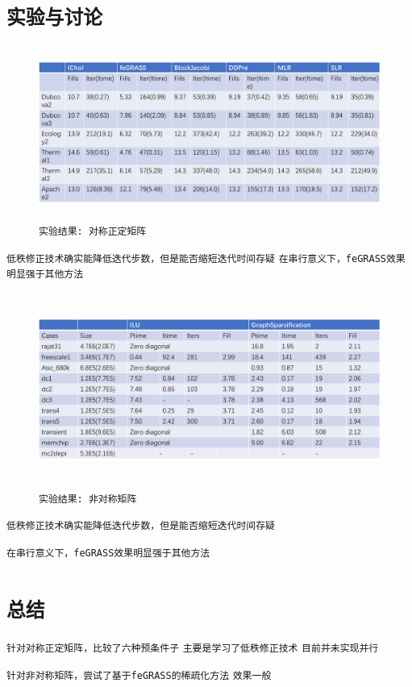 \documentclass[11pt, a4paper]{article}
\theoremstyle{plain}
\theoremstyle{plain}
\theoremstyle{plain}
\theoremstyle{definition}
\theoremstyle{remark}
\theoremstyle{definition}
\newcommand{\T}[1]{\texttt{#1}}
\begin{document}
\section*{\T{实验与讨论}}
\begin{figure}[H]
	\caption{\T{实验结果: 对称正定矩阵}}
	\centering
	\includegraphics[width=350pt,height=160pt]{SPD_res.png}
\end{figure}
\T{低秩修正技术确实能降低迭代步数，但是能否缩短迭代时间存疑}
\T{在串行意义下，feGRASS效果明显强于其他方法
}

\begin{figure}[H]
	\caption{\T{实验结果: 非对称矩阵}}
	\centering
	\includegraphics[width=350pt,height=180pt]{normal.png}
\end{figure}

\T{低秩修正技术确实能降低迭代步数，但是能否缩短迭代时间存疑}

\T{在串行意义下，feGRASS效果明显强于其他方法}



\section*{\T{总结}}
\T{针对对称正定矩阵，比较了六种预条件子}
\T{主要是学习了低秩修正技术}
\T{目前并未实现并行}

\T{针对非对称矩阵，尝试了基于feGRASS的稀疏化方法}
\T{效果一般}


\renewcommand{\refname}{\T{参考文献}}


\end{document}

